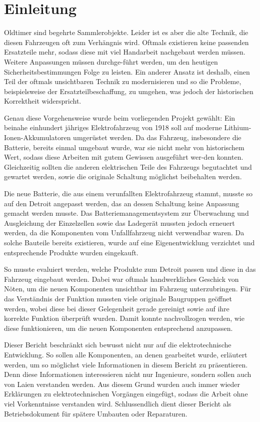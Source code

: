 \chapter{Einleitung}

Oldtimer sind begehrte Sammlerobjekte. Leider ist es aber die alte Technik, die diesen Fahrzeugen oft zum Verhängnis wird. Oftmals existieren keine passenden Ersatzteile mehr, sodass diese mit viel Handarbeit nachgebaut werden müssen. Weitere Anpassungen müssen durchge-führt werden, um den heutigen Sicherheitsbestimmungen Folge zu leisten. Ein anderer Ansatz ist deshalb, einen Teil der oftmals unsichtbaren Technik zu modernisieren und so die Probleme, beispielsweise der Ersatzteilbeschaffung, zu umgehen, was jedoch der historischen Korrektheit widerspricht.

Genau diese Vorgehensweise wurde beim vorliegenden Projekt gewählt: Ein beinahe einhundert jähriges Elektrofahrzeug von 1918 soll auf moderne Lithium-Ionen-Akkumulatoren umgerüstet werden. Da das Fahrzeug, insbesondere die Batterie, bereits einmal umgebaut wurde, war sie nicht mehr von historischem Wert, sodass diese Arbeiten mit gutem Gewissen ausgeführt wer-den konnten. Gleichzeitig sollten die anderen elektrischen Teile des Fahrzeugs begutachtet und gewartet werden, sowie die originale Schaltung möglichst beibehalten werden.

Die neue Batterie, die aus einem verunfallten Elektrofahrzeug stammt, musste so auf den Detroit angepasst werden, das an dessen Schaltung keine Anpassung gemacht werden musste. Das Batteriemanagementsystem zur Überwachung und Ausgleichung der Einzelzellen sowie das Ladegerät mussten jedoch erneuert werden, da die Komponenten vom Unfallfahrzeug nicht verwendbar waren. Da solche Bauteile bereits existieren, wurde auf eine Eigenentwicklung verzichtet und entsprechende Produkte wurden eingekauft.

So musste evaluiert werden, welche Produkte zum Detroit passen und diese in das Fahrzeug eingebaut werden. Dabei war oftmals handwerkliches Geschick von Nöten, um die neuen Komponenten unsichtbar im Fahrzeug unterzubringen. Für das Verständnis der Funktion mussten
viele originale Baugruppen geöffnet werden, wobei diese bei dieser Gelegenheit gerade gereinigt sowie auf ihre korrekte Funktion überprüft wurden. Damit konnte nachvollzogen werden, wie diese funktionieren, um die neuen Komponenten entsprechend anzupassen.

Dieser Bericht beschränkt sich bewusst nicht nur auf die elektrotechnische Entwicklung. So sollen alle Komponenten, an denen gearbeitet wurde, erläutert werden, um so möglichst viele Informationen in diesem Bericht zu präsentieren. Denn diese Informationen interessieren nicht nur Ingenieure, sondern sollen auch von Laien verstanden werden. Aus diesem Grund wurden auch immer wieder Erklärungen zu elektrotechnischen Vorgängen eingefügt, sodass die Arbeit ohne viel Vorkenntnisse verstanden wird. Schlussendlich dient dieser Bericht als Betriebsdokument für spätere Umbauten oder Reparaturen.
 \color{black}